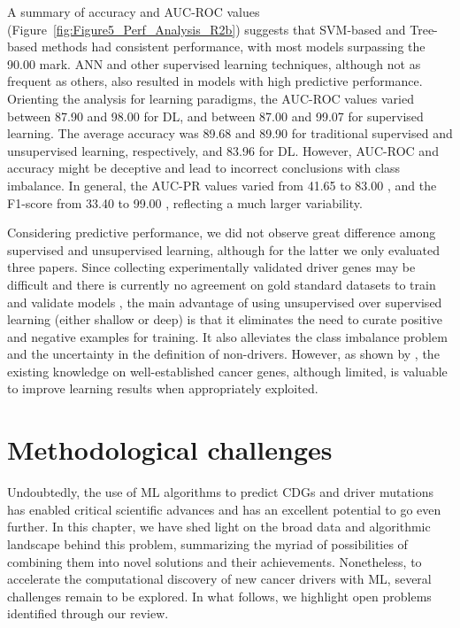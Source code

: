 A summary of accuracy and AUC-ROC values (Figure~\ref{fig:Figure5_Perf_Analysis_R2b}) suggests that 
SVM-based and Tree-based methods had consistent performance, with most models surpassing the 90.00 mark. ANN and other supervised learning techniques, although not as frequent as others, also resulted in models with high predictive performance. Orienting the analysis for learning paradigms, the AUC-ROC values varied between 87.90 \cite{Tavanaei2017} and 98.00 \cite{Luo2019} for DL, and between 87.00 \cite{Wang2018} and 99.07 \cite{Wang2020} for supervised learning. The average accuracy was 89.68 and 89.90 for traditional supervised and unsupervised learning, respectively, and 83.96 for DL. However, AUC-ROC and accuracy might be deceptive and lead to incorrect conclusions with class imbalance. In general, the AUC-PR values varied from 41.65 \cite{Gumpinger2020} to 83.00 \cite{Schulte-Sasse2019}, and the F1-score from 33.40 \cite{Gumpinger2020} to 99.00 \cite{Celli2018}, reflecting a much larger variability.

Considering predictive performance, we did not observe great difference among supervised and unsupervised learning, although for the latter we only evaluated three papers. Since collecting experimentally validated driver genes may be difficult and there is currently no agreement on gold standard datasets to train and validate models \cite{raimondi2021current}, the main advantage of using unsupervised over supervised learning (either shallow or deep) is that it eliminates the need to curate positive and negative examples for training. It also alleviates the class imbalance problem and the uncertainty in the definition of non-drivers. However, as shown by \citet{Gumpinger2020}, the existing knowledge on well-established cancer genes, although limited, is valuable to improve learning results when appropriately exploited.


\section{Methodological challenges} 
\label{sec:review:challenges}

Undoubtedly, the use of ML algorithms to predict CDGs and driver mutations has enabled critical scientific advances and has an excellent potential to go even further. In this chapter, we have shed light on the broad data and algorithmic landscape behind this problem, summarizing the myriad of possibilities of combining them into novel solutions and their achievements. Nonetheless, to accelerate the computational discovery of new cancer drivers with ML, several challenges remain to be explored. In what follows, we highlight open problems identified through our review.

